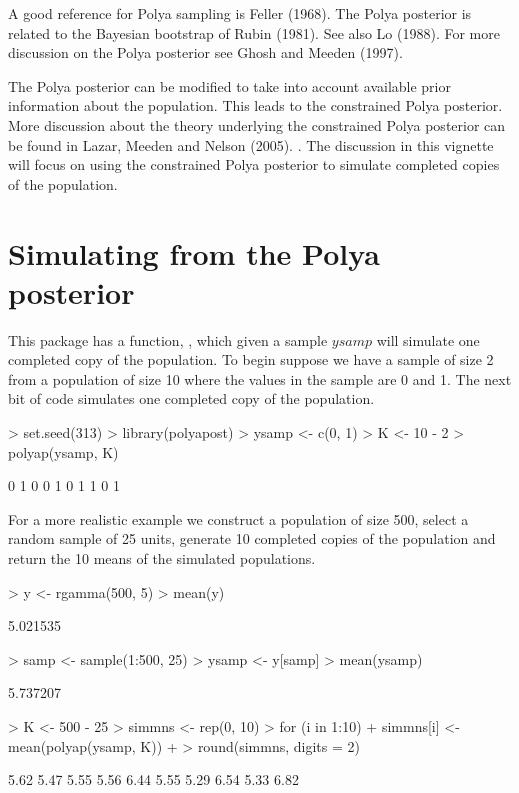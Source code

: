 \documentclass{article}
\begin{document}
 A good reference for  Polya
sampling is Feller (1968). \nocite{fel68} The Polya posterior is
related to the Bayesian bootstrap of Rubin (1981). \nocite{rub81}
See also Lo (1988). \nocite{lo88} For more discussion on the Polya 
posterior see Ghosh and Meeden (1997). \nocite{ghomee97}

The Polya posterior can be modified to take into account  
available prior information about the population. This leads to 
the constrained Polya posterior. More discussion about the theory
underlying the constrained Polya posterior can be found in 
 Lazar, Meeden and Nelson (2005). \nocite{l-m-n05}. The discussion 
in this vignette will focus on using the constrained Polya 
posterior to simulate completed copies of the population. 

\section{Simulating from the Polya posterior}

This package has a function, \verb@polyap@,  which given a sample $ysamp$ will 
simulate one completed copy of the population. 
To begin suppose we have a sample of size 2 from a population of 
size 10 where the  values in the sample are 0 and 1.
The next bit of code simulates one completed copy of the population.

\begin{Schunk}
\begin{Sinput}
> set.seed(313)
> library(polyapost)
> ysamp <- c(0, 1)
> K <- 10 - 2
> polyap(ysamp, K)
\end{Sinput}
\begin{Soutput}
 [1] 0 1 0 0 1 0 1 1 0 1
\end{Soutput}
\end{Schunk}

For a more realistic example 
we construct a population of size 500,  select a 
random sample of 25 units,  generate 10 completed copies of 
the population and return the 10 means of the simulated populations.  

\begin{Schunk}
\begin{Sinput}
> y <- rgamma(500, 5)
> mean(y)
\end{Sinput}
\begin{Soutput}
[1] 5.021535
\end{Soutput}
\begin{Sinput}
> samp <- sample(1:500, 25)
> ysamp <- y[samp]
> mean(ysamp)
\end{Sinput}
\begin{Soutput}
[1] 5.737207
\end{Soutput}
\begin{Sinput}
> K <- 500 - 25
> simmns <- rep(0, 10)
> for (i in 1:10) {
+     simmns[i] <- mean(polyap(ysamp, K))
+ }
> round(simmns, digits = 2)
\end{Sinput}
\begin{Soutput}
 [1] 5.62 5.47 5.55 5.56 6.44 5.55 5.29 6.54 5.33 6.82
\end{Soutput}
\end{Schunk}
\end{document}
